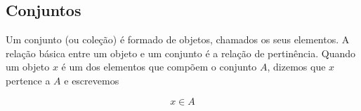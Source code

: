 
\subsection{Conjuntos}
Um conjunto (ou coleção) é formado de objetos, chamados os seus elementos. A relação básica entre um objeto e um conjunto é a relação de pertinência. Quando um objeto $x$ é um dos elementos que compõem o conjunto $A$, dizemos que $x$ pertence a $A$ e escrevemos

\[x \in A \]